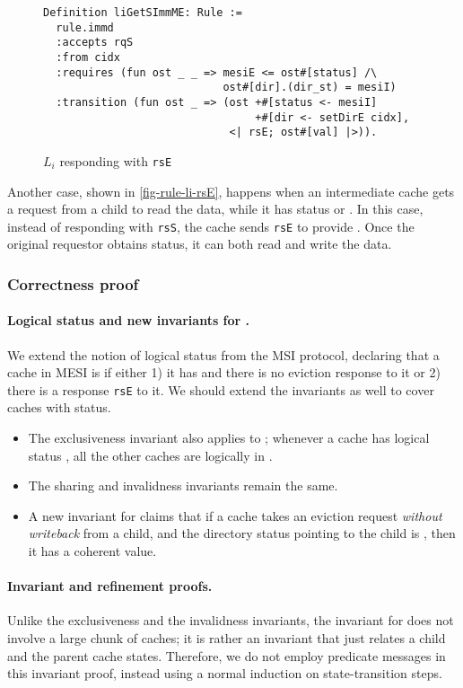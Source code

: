 \documentclass[sigplan,10pt,review,anonymous,screen]{acmart}\settopmatter{printfolios=true,printccs=false,printacmref=false}
\def\slstinline{\lstinline[basicstyle=\ttfamily\small]}
\begin{document}
\begin{figure}[h]
  \centering
\begin{lstlisting}
Definition liGetSImmME: Rule :=
  rule.immd
  :accepts rqS
  :from cidx
  :requires (fun ost _ _ => mesiE <= ost#[status] /\
                            ost#[dir].(dir_st) = mesiI)
  :transition (fun ost _ => (ost +#[status <- mesiI]
                                 +#[dir <- setDirE cidx],
                             <| rsE; ost#[val] |>)).
\end{lstlisting}
  \caption{$L_i$ responding with \slstinline{rsE}}
  \label{fig-rule-li-rsE}
\end{figure}

Another case, shown in \autoref{fig-rule-li-rsE}, happens when an intermediate cache gets a request from a child to read the data, while it has status \stE{} or \stM{}.
In this case, instead of responding with \slstinline{rsS}, the cache sends \slstinline{rsE} to provide \stE{}.
Once the original requestor obtains \stE{} status, it can both read and write the data.

\subsubsection{Correctness proof}
\label{sec-mesi-proof}

\paragraph{Logical status and new invariants for \stE{}.}
We extend the notion of logical status from the MSI protocol, declaring that a cache in MESI is \stE{} if either 1) it has \stE{} and there is no eviction response to it or 2) there is a response \slstinline{rsE} to it.
We should extend the invariants as well to cover caches with \stE{} status.
\begin{itemize}[leftmargin=*]
\item The exclusiveness invariant also applies to \stE{}; whenever a cache has logical status \stE{}, all the other caches are logically in \stI{}.
\item The sharing and invalidness invariants remain the same.
\item A new invariant for \stE{} claims that if a cache takes an eviction request \emph{without writeback} from a child, and the directory status pointing to the child is \stE{}, then it has a coherent value.
\end{itemize}

\paragraph{Invariant and refinement proofs.}
Unlike the exclusiveness and the invalidness invariants, the invariant for \stE{} does not involve a large chunk of caches; it is rather an invariant that just relates a child and the parent cache states.
Therefore, we do not employ predicate messages in this invariant proof, instead using a normal induction on state-transition steps.
\end{document}

